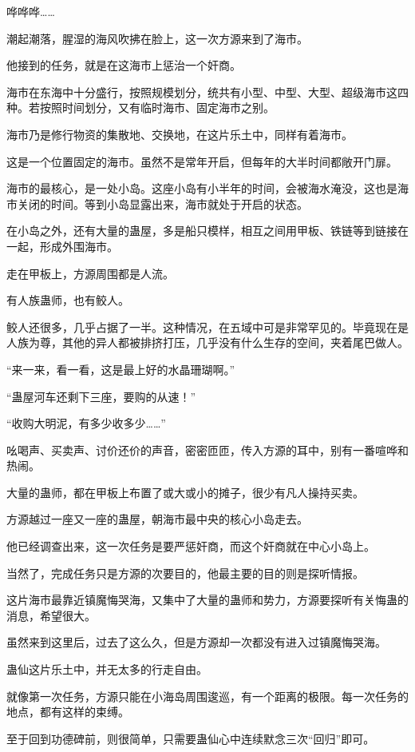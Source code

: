 \begin{this_body}
哗哗哗……

潮起潮落，腥湿的海风吹拂在脸上，这一次方源来到了海市。

他接到的任务，就是在这海市上惩治一个奸商。

海市在东海中十分盛行，按照规模划分，统共有小型、中型、大型、超级海市这四种。若按照时间划分，又有临时海市、固定海市之别。

海市乃是修行物资的集散地、交换地，在这片乐土中，同样有着海市。

这是一个位置固定的海市。虽然不是常年开启，但每年的大半时间都敞开门扉。

海市的最核心，是一处小岛。这座小岛有小半年的时间，会被海水淹没，这也是海市关闭的时间。等到小岛显露出来，海市就处于开启的状态。

在小岛之外，还有大量的蛊屋，多是船只模样，相互之间用甲板、铁链等到链接在一起，形成外围海市。

走在甲板上，方源周围都是人流。

有人族蛊师，也有鲛人。

鲛人还很多，几乎占据了一半。这种情况，在五域中可是非常罕见的。毕竟现在是人族为尊，其他的异人都被排挤打压，几乎没有什么生存的空间，夹着尾巴做人。

“来一来，看一看，这是最上好的水晶珊瑚啊。”

“蛊屋河车还剩下三座，要购的从速！”

“收购大明泥，有多少收多少……”

吆喝声、买卖声、讨价还价的声音，密密匝匝，传入方源的耳中，别有一番喧哗和热闹。

大量的蛊师，都在甲板上布置了或大或小的摊子，很少有凡人操持买卖。

方源越过一座又一座的蛊屋，朝海市最中央的核心小岛走去。

他已经调查出来，这一次任务是要严惩奸商，而这个奸商就在中心小岛上。

当然了，完成任务只是方源的次要目的，他最主要的目的则是探听情报。

这片海市最靠近镇魔悔哭海，又集中了大量的蛊师和势力，方源要探听有关悔蛊的消息，希望很大。

虽然来到这里后，过去了这么久，但是方源却一次都没有进入过镇魔悔哭海。

蛊仙这片乐土中，并无太多的行走自由。

就像第一次任务，方源只能在小海岛周围逡巡，有一个距离的极限。每一次任务的地点，都有这样的束缚。

至于回到功德碑前，则很简单，只需要蛊仙心中连续默念三次“回归”即可。


\end{this_body}
